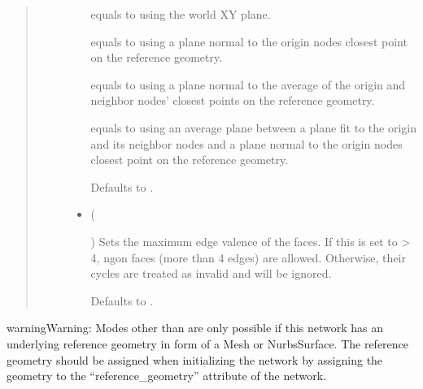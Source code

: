 \documentclass[letterpaper,10pt,english]{sphinxmanual}
\begin{document}
\begin{fulllineitems}
\begin{fulllineitems}
\begin{quote}
\begin{description}
\begin{itemize}
 equals to using the world XY plane.

 equals to using a plane normal to the origin nodes closest
point on the reference geometry.

 equals to using a plane normal to the average of the origin
and neighbor nodes’ closest points on the reference geometry.

 equals to using an average plane between a plane fit to the
origin and its neighbor nodes and a plane normal to the origin
nodes closest point on the reference geometry.

Defaults to .


\item {} 
 (%
\begin{footnote}[142]\sphinxAtStartFootnote
{}
%
\end{footnote}\sphinxstyleliteralemphasis{\sphinxupquote{, }}) \textendash{} 
Sets the maximum edge valence of the faces. If this is set to \textgreater{} 4,
n\sphinxhyphen{}gon faces (more than 4 edges) are allowed. Otherwise, their
cycles are treated as invalid and will be ignored.

Defaults to .


\end{itemize}

\end{description}\end{quote}

\begin{sphinxadmonition}{warning}{Warning:}
Modes other than  are only possible if this network has an
underlying reference geometry in form of a Mesh or NurbsSurface. The
reference geometry should be assigned when initializing the network by
assigning the geometry to the “reference\_geometry” attribute of the
network.
\end{sphinxadmonition}

\end{fulllineitems}



\end{fulllineitems}
\end{document}
